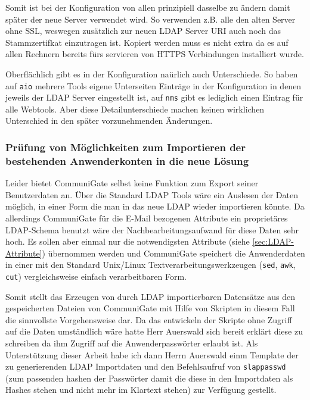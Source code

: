 \documentclass[11pt,a4paper,titlepage=firstiscover]{scrartcl} %
\begin{document}
Somit ist bei der Konfiguration von allen prinzipiell dasselbe zu \"andern damit sp\"ater der neue Server verwendet wird. So verwenden z.B. alle den alten Server ohne SSL, weswegen zus\"atzlich zur neuen LDAP Server URI auch noch das Stammzertifkat einzutragen ist. Kopiert werden muss es nicht extra da es auf allen Rechnern bereits f\"urs servieren von HTTPS Verbindungen installiert wurde. 

Oberfl\"achlich gibt es in der Konfiguration na\"urlich auch Unterschiede. So haben auf \texttt{aio} mehrere Tools eigene Unterseiten Eintr\"age in der Konfiguration in denen jeweils der LDAP Server eingestellt ist, auf \texttt{nms} gibt es lediglich einen Eintrag f\"ur alle Webtools. Aber diese Detailunterschiede machen keinen wirklichen Unterschied in den sp\"ater vorzunehmenden \"Anderungen.

\subsubsection{Pr\"ufung von M\"oglichkeiten zum Importieren der bestehenden Anwenderkonten in die neue L\"osung}
Leider bietet CommuniGate selbst keine Funktion zum Export seiner Benutzerdaten an. \"Uber die Standard LDAP Tools w\"are ein Auslesen der Daten m\"oglich, in einer Form die man in das neue LDAP wieder importieren k\"onnte. Da allerdings CommuniGate f\"ur die E-Mail bezogenen Attribute ein propriet\"ares LDAP-Schema benutzt w\"are der Nachbearbeitungsaufwand f\"ur diese Daten sehr hoch. Es sollen aber einmal nur die notwendigsten Attribute (siehe \autoref{sec:LDAP-Attribute}) \"ubernommen werden und CommuniGate speichert die Anwenderdaten in einer mit den Standard Unix/Linux Textverarbeitungswerkzeugen (\texttt{sed}, \texttt{awk}, \texttt{cut}) vergleichsweise einfach verarbeitbaren Form. 

Somit stellt das Erzeugen von durch LDAP importierbaren Datens\"atze aus den gespeicherten Dateien von CommuniGate mit Hilfe von Skripten in diesem Fall die sinnvollste Vorgehensweise dar. Da das entwickeln der Skripte ohne Zugriff auf die Daten umst\"andlich w\"are hatte Herr Auerswald sich bereit erkl\"art diese zu schreiben da ihm Zugriff auf die Anwenderpassw\"orter erlaubt ist. Als Unterst\"utzung dieser Arbeit habe ich dann Herrn Auerswald einm Template der zu generierenden LDAP Importdaten und den Befehlsaufruf von \texttt{slappasswd} (zum passenden hashen der Passw\"orter damit die diese in den Importdaten als Hashes stehen und nicht mehr im Klartext stehen) zur Verf\"ugung gestellt.
\end{document}
